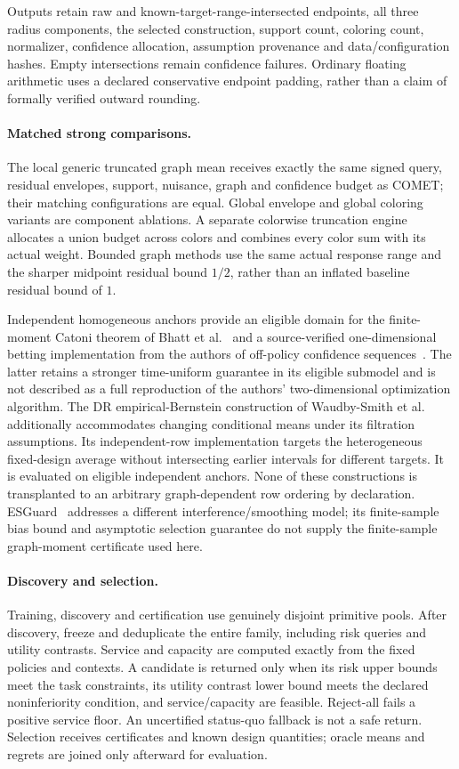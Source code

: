 Outputs retain raw and known-target-range-intersected endpoints, all three
radius components, the selected construction, support count, coloring count,
normalizer, confidence allocation, assumption provenance and data/configuration
hashes. Empty intersections remain confidence failures. Ordinary floating
arithmetic uses a declared conservative endpoint padding, rather than a claim
of formally verified outward rounding.

\paragraph{Matched strong comparisons.}
The local generic truncated graph mean receives exactly the same signed
query, residual envelopes, support, nuisance, graph and confidence budget as
COMET; their matching configurations are equal. Global envelope and global
coloring variants are component ablations. A separate colorwise truncation
engine allocates a union budget across colors and combines every color sum
with its actual weight. Bounded graph methods use the same actual response
range and the sharper midpoint residual bound $1/2$, rather than an inflated
baseline residual bound of $1$.

Independent homogeneous anchors provide an eligible domain for the
finite-moment Catoni theorem of Bhatt et al.~\cite{bhatt2022} and a
source-verified one-dimensional betting implementation from the authors of
off-policy confidence sequences~\cite{ope2021}. The latter retains a stronger
time-uniform guarantee in its eligible submodel and is not described as a
full reproduction of the authors' two-dimensional optimization algorithm.
The DR empirical-Bernstein construction of
Waudby-Smith et al.~\cite{ope2024} additionally accommodates changing
conditional means under its filtration assumptions. Its independent-row
implementation targets the heterogeneous fixed-design average without
intersecting earlier intervals for different targets. It is evaluated on
eligible independent anchors. None of these constructions is transplanted
to an arbitrary graph-dependent row ordering by declaration.
ESGuard~\cite{esguard2026} addresses a different interference/smoothing model;
its finite-sample bias bound and asymptotic selection guarantee do not supply
the finite-sample graph-moment certificate used here.

\paragraph{Discovery and selection.}
Training, discovery and certification use genuinely disjoint primitive pools.
After discovery, freeze and deduplicate the entire family, including risk
queries and utility contrasts. Service and capacity are computed exactly from
the fixed policies and contexts. A candidate is returned only when its risk
upper bounds meet the task constraints, its utility contrast lower bound meets
the declared noninferiority condition, and service/capacity are feasible.
Reject-all fails a positive service floor. An uncertified status-quo fallback
is not a safe return. Selection receives certificates and known design
quantities; oracle means and regrets are joined only afterward for evaluation.
